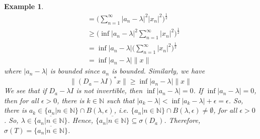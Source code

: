 \documentclass{report}
\newtheorem{exm}{Example}
\begin{document}
\begin{exm}
$$\begin{aligned}
                                                                               &=\Big(\sum^{\infty}_{n=1}|a_{n}-\lambda|^{2}|x_{n}|^{2}\Big)^{\frac{1}{2}}\\
                                                                               &\geq\Big(\inf|a_{n}-\lambda|^{2}\sum^{\infty}_{n=1}|x_{n}|^{2}\Big)^{\frac{1}{2}}\\
                                                                               &=\inf|a_{n}-\lambda|\Big(\sum^{\infty}_{n=1}|x_{n}|^{2}\Big)^{\frac{1}{2}}\\
                                                                               &=\inf|a_{n}-\lambda|\|x\|
  \end{aligned}
  $$
  where $|a_{n}-\lambda|$ is bounded since $a_{n}$ is bounded. Similarly, we have
  $$
  \|(D_{a}-\lambda I)^{*}x\|\geq\inf|a_{n}-\lambda|\|x\|
  $$
  We see that if $D_{a}-\lambda I$ is not invertible, then $\inf|a_{n}-\lambda|=0$. If $\inf|a_{n}-\lambda|=0$, then for all $\epsilon>0$, there is $k\in\mathbb{N}$ such that $|a_{k}-\lambda|<\inf|a_{k}-\lambda|+\epsilon=\epsilon$. So, there is $a_{k}\in\{a_{n}|n\in\mathbb{N}\}\cap B(\lambda,\epsilon)$, i.e. $\{a_{n}|n\in\mathbb{N}\}\cap B(\lambda,\epsilon)\not=\emptyset$, for all $\epsilon>0$. So, $\lambda\in\overline{\{a_{n}|n\in\mathbb{N}\}}$. Hence, $\overline{\{a_{n}|n\in\mathbb{N}\}}\subseteq\sigma(D_{a})$. Therefore, $\sigma(T)=\overline{\{a_{n}|n\in\mathbb{N}\}}$.
\end{exm}
\end{document}
